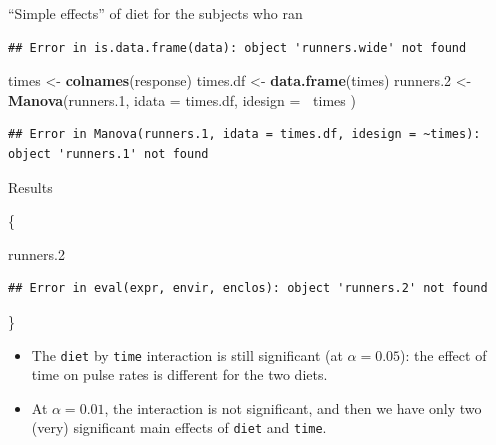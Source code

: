 \documentclass[ignorenonframetext,]{beamer}
\newenvironment{Shaded}{\begin{snugshade}}{\end{snugshade}}
\newcommand{\DataTypeTok}[1]{\textcolor[rgb]{0.13,0.29,0.53}{#1}}
\newcommand{\FloatTok}[1]{\textcolor[rgb]{0.00,0.00,0.81}{#1}}
\newcommand{\KeywordTok}[1]{\textcolor[rgb]{0.13,0.29,0.53}{\textbf{#1}}}
\newcommand{\NormalTok}[1]{#1}
\newcommand{\OperatorTok}[1]{\textcolor[rgb]{0.81,0.36,0.00}{\textbf{#1}}}
\newcommand{\StringTok}[1]{\textcolor[rgb]{0.31,0.60,0.02}{#1}}
\begin{document}
\begin{frame}[fragile]{``Simple effects'' of diet for the subjects who
ran}
\begin{verbatim}
## Error in is.data.frame(data): object 'runners.wide' not found
\end{verbatim}

\begin{Shaded}
\begin{Highlighting}[]
\NormalTok{times <-}\StringTok{ }\KeywordTok{colnames}\NormalTok{(response)}
\NormalTok{times.df <-}\StringTok{ }\KeywordTok{data.frame}\NormalTok{(times)}
\NormalTok{runners}\FloatTok{.2}\NormalTok{ <-}\StringTok{ }\KeywordTok{Manova}\NormalTok{(runners}\FloatTok{.1}\NormalTok{,}
  \DataTypeTok{idata =}\NormalTok{ times.df,}
  \DataTypeTok{idesign =} \OperatorTok{~}\NormalTok{times}
\NormalTok{)}
\end{Highlighting}
\end{Shaded}

\begin{verbatim}
## Error in Manova(runners.1, idata = times.df, idesign = ~times): object 'runners.1' not found
\end{verbatim}

\end{frame}

\begin{frame}[fragile]{Results}
\protect\hypertarget{results-2}{}

\{\footnotesize

\begin{Shaded}
\begin{Highlighting}[]
\NormalTok{runners}\FloatTok{.2}
\end{Highlighting}
\end{Shaded}

\begin{verbatim}
## Error in eval(expr, envir, enclos): object 'runners.2' not found
\end{verbatim}

\}

\begin{itemize}
\item
  The \texttt{diet} by \texttt{time} interaction is still significant
  (at \(\alpha=0.05\)): the effect of time on pulse rates is different
  for the two diets.
\item
  At \(\alpha=0.01\), the interaction is not significant, and then we
  have only two (very) significant main effects of \texttt{diet} and
  \texttt{time}.
\end{itemize}

\end{frame}
\end{document}
